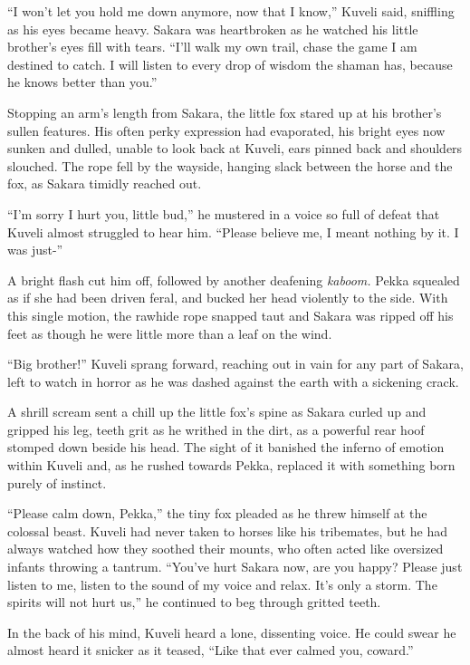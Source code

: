 ``I won't let you hold me down anymore, now that I know,'' Kuveli said, sniffling as his eyes became heavy. Sakara was heartbroken as he watched his little brother's eyes fill with tears. ``I'll walk my own trail, chase the game I am destined to catch. I will listen to every drop of wisdom the shaman has, because he knows better than you.''

Stopping an arm's length from Sakara, the little fox stared up at his brother's sullen features. His often perky expression had evaporated, his bright eyes now sunken and dulled, unable to look back at Kuveli, ears pinned back and shoulders slouched. The rope fell by the wayside, hanging slack between the horse and the fox, as Sakara timidly reached out.

``I'm sorry I hurt you, little bud,'' he mustered in a voice so full of defeat that Kuveli almost struggled to hear him. ``Please believe me, I meant nothing by it. I was just-''

A bright flash cut him off, followed by another deafening \emph{kaboom.} Pekka squealed as if she had been driven feral, and bucked her head violently to the side. With this single motion, the rawhide rope snapped taut and Sakara was ripped off his feet as though he were little more than a leaf on the wind.

``Big brother!'' Kuveli sprang forward, reaching out in vain for any part of Sakara, left to watch in horror as he was dashed against the earth with a sickening crack.

A shrill scream sent a chill up the little fox's spine as Sakara curled up and gripped his leg, teeth grit as he writhed in the dirt, as a powerful rear hoof stomped down beside his head. The sight of it banished the inferno of emotion within Kuveli and, as he rushed towards Pekka, replaced it with something born purely of instinct.

``Please calm down, Pekka,'' the tiny fox pleaded as he threw himself at the colossal beast. Kuveli had never taken to horses like his tribemates, but he had always watched how they soothed their mounts, who often acted like oversized infants throwing a tantrum. ``You've hurt Sakara now, are you happy? Please just listen to me, listen to the sound of my voice and relax. It's only a storm. The spirits will not hurt us,'' he continued to beg through gritted teeth.

In the back of his mind, Kuveli heard a lone, dissenting voice. He could swear he almost heard it snicker as it teased, ``Like that ever calmed you, coward.''

